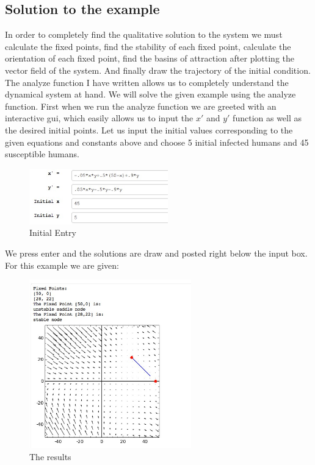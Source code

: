 \documentclass{article}
\begin{document}
\subsection{Solution to the example}
In order to completely find the qualitative solution to the system we must calculate the fixed points, find the stability of each fixed point, calculate the orientation of each fixed point, find the basins of attraction after plotting the vector field of the system. And finally draw the trajectory of the initial condition.
\newline
\linebreak
The analyze function I have written allows us to completely understand the dynamical system at hand. We will solve the given example using the analyze function.
 First when we run the analyze function we are greeted with an interactive gui, which easily allows us to input the $x'$ and $y'$ function as well as the desired initial points. Let us input the initial values corresponding to the given equations and constants above and choose 5 initial infected humans and 45 susceptible humans.
\begin{figure}[ht!]
\centering
\includegraphics[width=60mm]{initialentryr.jpg}
\caption{Initial Entry}
\label{overflow}
\end{figure}
\newline
We press enter and the solutions are draw and posted right below the input box. For this example we are given:
\begin{figure}[ht!]
\centering
\includegraphics[width=70mm]{results.jpg}
\caption{The results}
\label{overflow}
\end{figure}
\end{document}

